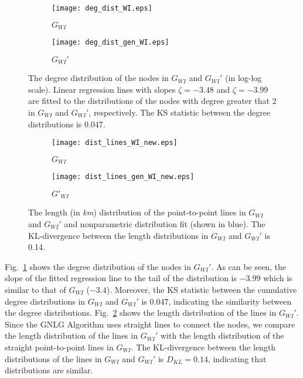 \documentclass[10pt,journal]{IEEEtran}
\begin{document}
\begin{figure}[t]
\centering
\begin{subfigure}[b]{0.24\textwidth}
\vspace*{-0.2cm}
\texttt{[image: deg\_dist\_WI.eps]}
\caption{$G_{WI}$}
\vspace*{0.2cm}
\end{subfigure}
\begin{subfigure}[b]{0.24\textwidth}
\vspace*{-0.2cm}
\texttt{[image: deg\_dist\_gen\_WI.eps]}
\caption{$G_{WI}'$}
\vspace*{0.2cm}
\end{subfigure}
\vspace*{-0.7cm}
\caption{The degree distribution of the nodes in $G_{WI}$ and $G_{WI}'$ (in
log-log scale). Linear regression lines with slopes $\zeta=-3.48$ and $\zeta=-3.99$ are fitted  to
the distributions of the nodes with degree greater that 2 in $G_{WI}$ and $G_{WI}'$, respectively. The KS statistic between the degree distributions is $0.047$.}
\label{fig:deg_dist_gen_WI}
\vspace*{0.2cm}
\end{figure}
\begin{figure}[t]
\centering
\vspace*{-0.2cm}
\begin{subfigure}[b]{0.23\textwidth}
\vspace*{-0.2cm}
\texttt{[image: dist\_lines\_WI\_new.eps]}
\caption{$G_{WI}$}
\vspace*{0.2cm}
\end{subfigure}
\begin{subfigure}[b]{0.23\textwidth}
\vspace*{-0.2cm}
\texttt{[image: dist\_lines\_gen\_WI\_new.eps]}
\caption{$G'_{WI}$}
\vspace*{0.2cm}
\end{subfigure}
\vspace{-0.4cm}
\caption{The length (in \emph{km}) distribution of the point-to-point lines in  $G_{WI}$ and $G_{WI}'$ and nonparametric distribution fit (shown in blue). The KL-divergence between the length distributions in $G_{WI}$ and $G_{WI}'$ is 0.14.}
\label{fig:dist_lines_gen_WI}
\vspace*{0.2cm}
\end{figure}


 Fig.~\ref{fig:deg_dist_gen_WI} shows the degree distribution of the nodes in $G_{WI}'$. As can be seen, the slope of the fitted regression line to the tail of the distribution is $-3.99$ which is similar to that of $G_{WI}$ ($-3.4$). Moreover, the KS statistic between the cumulative degree distributions in $G_{WI}$ and $G_{WI}'$ is $0.047$, indicating the similarity between the degree distributions.
Fig.~\ref{fig:dist_lines_gen_WI} shows the length distribution of the lines in $G_{WI}'$. Since the GNLG Algorithm uses straight lines to connect the nodes, we compare the length distribution of the lines in $G_{WI}'$ with the length distribution of the straight point-to-point lines in $G_{WI}$.  The KL-divergence between the length distributions of the lines in $G_{WI}$ and $G_{WI}'$ is $D_{KL}=0.14$, indicating that  distributions are similar.
\end{document}
